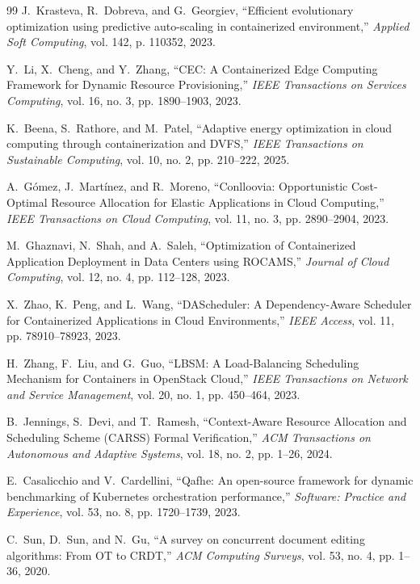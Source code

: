 \documentclass[12pt,a4paper]{report}
\begin{document}
{\begin{thebibliography}{99}
J.~Krasteva, R.~Dobreva, and G.~Georgiev,
``Efficient evolutionary optimization using predictive auto-scaling in containerized environment,''
\textit{Applied Soft Computing}, vol. 142, p. 110352, 2023.

Y.~Li, X.~Cheng, and Y.~Zhang,
``CEC: A Containerized Edge Computing Framework for Dynamic Resource Provisioning,''
\textit{IEEE Transactions on Services Computing}, vol. 16, no. 3, pp. 1890--1903, 2023.

K.~Beena, S.~Rathore, and M.~Patel,
``Adaptive energy optimization in cloud computing through containerization and DVFS,''
\textit{IEEE Transactions on Sustainable Computing}, vol. 10, no. 2, pp. 210--222, 2025.

A.~G\'omez, J.~Mart\'inez, and R.~Moreno,
``Conlloovia: Opportunistic Cost-Optimal Resource Allocation for Elastic Applications in Cloud Computing,''
\textit{IEEE Transactions on Cloud Computing}, vol. 11, no. 3, pp. 2890--2904, 2023.

M.~Ghaznavi, N.~Shah, and A.~Saleh,
``Optimization of Containerized Application Deployment in Data Centers using ROCAMS,''
\textit{Journal of Cloud Computing}, vol. 12, no. 4, pp. 112--128, 2023.

X.~Zhao, K.~Peng, and L.~Wang,
``DAScheduler: A Dependency-Aware Scheduler for Containerized Applications in Cloud Environments,''
\textit{IEEE Access}, vol. 11, pp. 78910--78923, 2023.

H.~Zhang, F.~Liu, and G.~Guo,
``LBSM: A Load-Balancing Scheduling Mechanism for Containers in OpenStack Cloud,''
\textit{IEEE Transactions on Network and Service Management}, vol. 20, no. 1, pp. 450--464, 2023.

B.~Jennings, S.~Devi, and T.~Ramesh,
``Context-Aware Resource Allocation and Scheduling Scheme (CARSS) Formal Verification,''
\textit{ACM Transactions on Autonomous and Adaptive Systems}, vol. 18, no. 2, pp. 1--26, 2024.

E.~Casalicchio and V.~Cardellini,
``Qafhe: An open-source framework for dynamic benchmarking of Kubernetes orchestration performance,''
\textit{Software: Practice and Experience}, vol. 53, no. 8, pp. 1720--1739, 2023.

C.~Sun, D.~Sun, and N.~Gu,
``A survey on concurrent document editing algorithms: From OT to CRDT,''
\textit{ACM Computing Surveys}, vol. 53, no. 4, pp. 1--36, 2020.

\end{thebibliography}}
\end{document}
